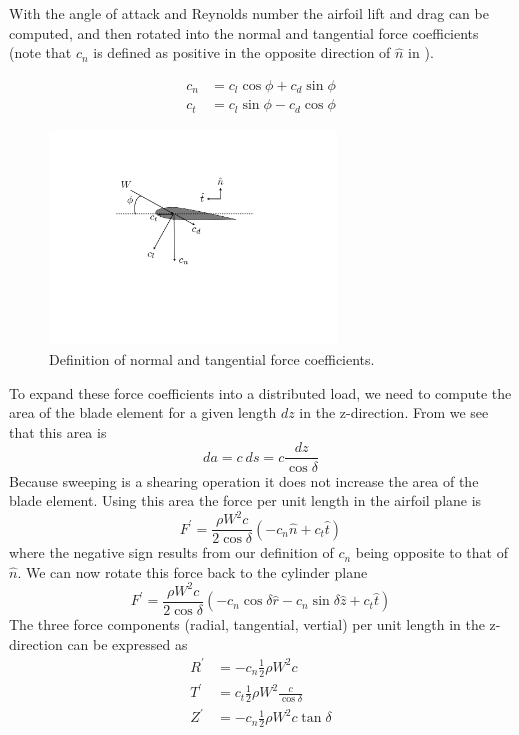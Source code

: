 \documentclass{article}
\begin{document}
With the angle of attack and Reynolds number the airfoil lift and drag can be computed, and then rotated into the normal and tangential force coefficients (note that $c_n$ is defined as positive in the opposite direction of $\hat{n}$ in ).

\begin{equation}
\begin{aligned}
c_n &= c_l \cos\phi + c_d\sin\phi \\
c_t &= c_l \sin\phi - c_d\cos\phi
\label{eq:cn}
\end{aligned}
\end{equation}

\begin{figure}[htbp]
\begin{center}
\includegraphics[width=3in]{images/cn}
\caption{Definition of normal and tangential force coefficients.}
\label{fig:cn}
\end{center}
\end{figure}

To expand these force coefficients into a distributed load, we need to compute the area of the blade element for a given length $dz$ in the z-direction.  From  we see that this area is
\begin{equation}
 da = c\ ds = c \frac{dz}{\cos\delta}
\end{equation}
Because sweeping is a shearing operation it does not increase the area of the blade element.  Using this area the force per unit length in the airfoil plane is
\begin{equation}
  F^\prime = \frac{\rho W^2 c}{2 \cos\delta} (-c_n \hat{n} + c_t\hat{t})
\end{equation}
where the negative sign results from our definition of $c_n$ being opposite to that of $\hat{n}$.  We can now rotate this force back to the cylinder plane
\begin{equation}
  F^\prime = \frac{\rho W^2 c}{2 \cos\delta} (-c_n \cos\delta \hat{r} - c_n\sin\delta \hat{z} + c_t\hat{t})
\end{equation}
The three force components (radial, tangential, vertial) per unit length in the z-direction can be expressed as
\begin{equation}
\begin{aligned}
  R^\prime &= -c_n \frac{1}{2} \rho W^2 c \\
  T^\prime &= c_t \frac{1}{2}\rho W^2 \frac{c}{\cos\delta } \\
  Z^\prime &= -c_n\frac{1}{2}\rho W^2 c \tan\delta
  \label{eq:forces}
\end{aligned}
\end{equation}
\end{document}
